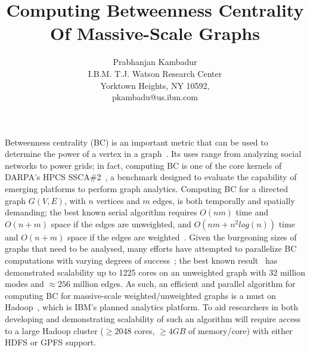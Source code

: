 \documentclass{article}
\begin{document}
%
\title{Computing Betweenness Centrality Of Massive-Scale Graphs}

\author{
Prabhanjan Kambadur \\
I.B.M. T.J. Watson Research Center \\
Yorktown Heights, NY 10592, \\
pkambadu@us.ibm.com}
\date{}

\maketitle

Betweenness centrality (BC) is an important metric that can be used to
determine the power of a vertex in a graph~\cite{Freeman77,Anthonisse71}.
%
Its uses range from analyzing social networks to power grids; in fact,
computing BC is one of the core kernels of DARPA's HPCS
SSCA\#2~\cite{ssca_matlab}, a benchmark designed to evaluate the capability of
emerging platforms to perform graph analytics.
%
Computing BC for a directed graph $G(V,E)$, with $n$ vertices and $m$ edges, is
both temporally and spatially demanding; the best known serial algorithm
requires $O(nm)$ time and $O(n+m)$ space if the edges are unweighted, and
$O(nm+n^2log(n))$ time and $O(n+m)$ space if the edges are
weighted~\cite{brandes01:_mathsoc}.
%
Given the burgeoning sizes of graphs that need to be analysed, many efforts
have attempted to parallelize BC computations with varying degrees of
success~\cite{Madduri:2009,Santos:2006,edmonds-hipc-2010,Yang05,buluc-2010};
the best known result~\cite{buluc-2010} has demonstrated scalability up to 
1225 cores on an unweighted graph with $32$ million modes and $\approx{}256$
million edges.
%
As such, an efficient and parallel algorithm for computing BC for massive-scale
weighted/unweighted graphs is a must on Hadoop~\cite{Hadoop}, which is IBM's
planned analytics platform.
%
To aid researchers in both developing and demonstrating scalability of such an
algorithm will require access to a large Hadoop cluster ($\ge{}2048{}$ cores,
$\ge{}4GB$ of memory/core) with either HDFS or GPFS support.





\end{document}
